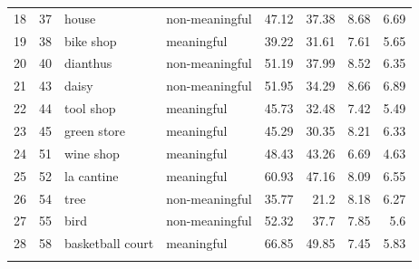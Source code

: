 \begin{longtable}{lrllrrrr}
	18 & 37      & house            & non-meaningful & 47.12    & 37.38      & 8.68    & 6.69      \\
	19 & 38      & bike shop        & meaningful     & 39.22    & 31.61      & 7.61    & 5.65      \\
	20 & 40      & dianthus         & non-meaningful & 51.19    & 37.99      & 8.52    & 6.35      \\
	21 & 43      & daisy            & non-meaningful & 51.95    & 34.29      & 8.66    & 6.89      \\
	22 & 44      & tool shop        & meaningful     & 45.73    & 32.48      & 7.42    & 5.49      \\
	23 & 45      & green store      & meaningful     & 45.29    & 30.35      & 8.21    & 6.33      \\
	24 & 51      & wine shop        & meaningful     & 48.43    & 43.26      & 6.69    & 4.63      \\
	25 & 52      & la cantine       & meaningful     & 60.93    & 47.16      & 8.09    & 6.55      \\
	26 & 54      & tree             & non-meaningful & 35.77    & 21.2       & 8.18    & 6.27      \\
	27 & 55      & bird             & non-meaningful & 52.32    & 37.7       & 7.85    & 5.6       \\
	28 & 58      & basketball court & meaningful     & 66.85    & 49.85      & 7.45    & 5.83     \\
	\hiderowcolors	\hline \hline
	\label{tab:starting_loc_info}
\end{longtable}

